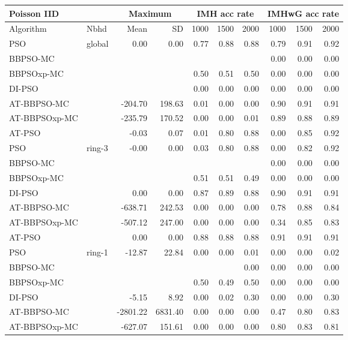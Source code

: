 \documentclass[12pt]{article}
\begin{document}
\begin{table}[h]
\centering
\tiny{
\begin{tabular}{llrr|rrr|rrr}
\multicolumn{2}{l}{Poisson IID}& \multicolumn{2}{c}{Maximum} & \multicolumn{3}{c}{IMH acc rate}  &\multicolumn{3}{c}{IMHwG acc rate}\\
\hline
Algorithm & Nbhd & Mean & SD & 1000 & 1500 & 2000 & 1000 & 1500 & 2000 \\ 
  \hline
PSO & global & 0.00 & 0.00 & 0.77 & 0.88 & 0.88 & 0.79 & 0.91 & 0.92 \\ 
  BBPSO-MC &  &  &  &  &  &  & 0.00 & 0.00 & 0.00 \\ 
  BBPSOxp-MC &  &  &  & 0.50 & 0.51 & 0.50 & 0.00 & 0.00 & 0.00 \\ 
  DI-PSO &  &  &  & 0.00 & 0.00 & 0.00 & 0.00 & 0.00 & 0.00 \\ 
  AT-BBPSO-MC &  & -204.70 & 198.63 & 0.01 & 0.00 & 0.00 & 0.90 & 0.91 & 0.91 \\ 
  AT-BBPSOxp-MC &  & -235.79 & 170.52 & 0.00 & 0.00 & 0.01 & 0.89 & 0.88 & 0.89 \\ 
  AT-PSO &  & -0.03 & 0.07 & 0.01 & 0.80 & 0.88 & 0.00 & 0.85 & 0.92 \\ \hline
  PSO & ring-3 & -0.00 & 0.00 & 0.03 & 0.80 & 0.88 & 0.00 & 0.82 & 0.92 \\ 
  BBPSO-MC &  &  &  &  &  &  & 0.00 & 0.00 & 0.00 \\ 
  BBPSOxp-MC &  &  &  & 0.51 & 0.51 & 0.49 & 0.00 & 0.00 & 0.00 \\ 
  DI-PSO &  & 0.00 & 0.00 & 0.87 & 0.89 & 0.88 & 0.90 & 0.91 & 0.91 \\ 
  AT-BBPSO-MC &  & -638.71 & 242.53 & 0.00 & 0.00 & 0.00 & 0.78 & 0.88 & 0.84 \\ 
  AT-BBPSOxp-MC &  & -507.12 & 247.00 & 0.00 & 0.00 & 0.00 & 0.34 & 0.85 & 0.83 \\ 
  AT-PSO &  & 0.00 & 0.00 & 0.88 & 0.88 & 0.88 & 0.91 & 0.91 & 0.91 \\ \hline
  PSO & ring-1 & -12.87 & 22.84 & 0.00 & 0.00 & 0.01 & 0.00 & 0.00 & 0.02 \\ 
  BBPSO-MC &  &  &  &  &  & 0.00 & 0.00 & 0.00 & 0.00 \\ 
  BBPSOxp-MC &  &  &  & 0.50 & 0.49 & 0.50 & 0.00 & 0.00 & 0.00 \\ 
  DI-PSO &  & -5.15 & 8.92 & 0.00 & 0.02 & 0.30 & 0.00 & 0.00 & 0.30 \\ 
  AT-BBPSO-MC &  & -2801.22 & 6831.40 & 0.00 & 0.00 & 0.00 & 0.47 & 0.80 & 0.83 \\ 
  AT-BBPSOxp-MC &  & -627.07 & 151.61 & 0.00 & 0.00 & 0.00 & 0.80 & 0.83 & 0.81 \\ 

\end{tabular}}
\end{table}
\end{document}
